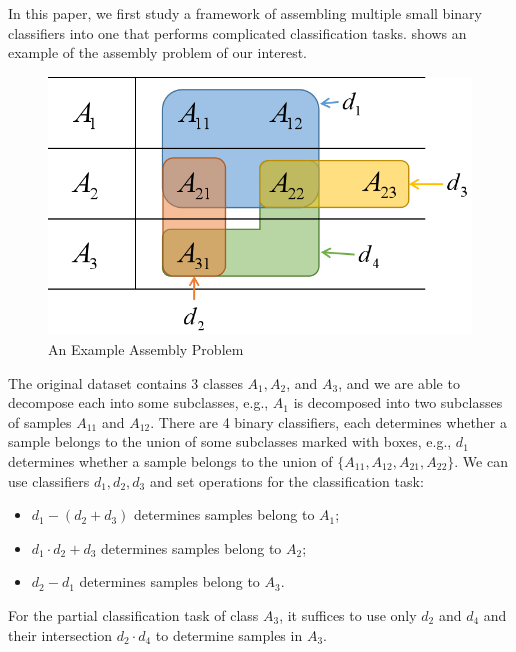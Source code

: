 \documentclass[sigplan,10pt,review]{acmart}\settopmatter{printfolios=true,printccs=false,printacmref=false}
\begin{document}
In this paper, we first study a framework of assembling multiple small binary classifiers into one that performs complicated classification tasks.
 shows an example of the assembly problem of our interest.

\begin{figure}[h]
    \centering
    \includegraphics[width=0.75\linewidth]{fig/formulation_example.png}
    \caption{An Example Assembly Problem}
    \label{fig:assemble-example-venn}
\end{figure}

The original dataset contains 3 classes $A_1, A_2$, and $A_3$, and we are able to decompose each into some subclasses, e.g., $A_1$ is decomposed into two subclasses of samples $A_{11}$ and $A_{12}$.
There are 4 binary classifiers, each determines whether a sample belongs to the union of some subclasses marked with boxes, e.g., $d_1$ determines whether a sample belongs to the union of $\{A_{11}, A_{12}, A_{21}, A_{22}\}$.
We can use classifiers $d_1, d_2, d_3$ and set operations for the classification task:
\begin{itemize}
	\item $d_1 - (d_2 + d_3)$ determines samples belong to $A_1$;
	\item $d_1 \cdot d_2 + d_3$ determines samples belong to $A_2$;
	\item $d_2 - d_1$ determines samples belong to $A_3$.
\end{itemize}
For the partial classification task of class $A_3$, it suffices to use only $d_2$ and $d_4$ and their intersection $d_2 \cdot d_4$ to determine samples in $A_3$.
\end{document}
